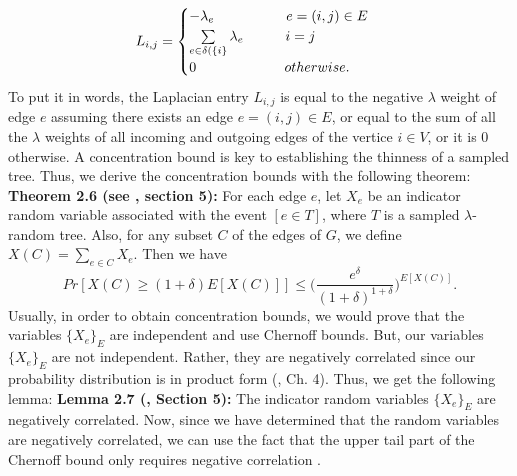 \documentclass[oneside]{projectpaper} %
\begin{document}
\begin{equation*}
L_{i,j} = 
  \begin{cases}
    -\lambda_e \indent \indent \indent \ \ e = (i,j) \in E \\
    \sum\limits_{e \in \delta(\{i\}}\lambda_e \indent \indent i = j \\
    0 \indent \indent \indent \indent \ otherwise.
  \end{cases}
\end{equation*}
To put it in words, the Laplacian entry $L_{i,j}$ is equal to the negative $\lambda$ weight of edge $e$ assuming there exists an edge $e = (i, j) \in E$, or equal to the sum of all the $\lambda$ weights of all incoming and outgoing edges of the vertice $i \in V$, or it is 0 otherwise. \newline
\indent A concentration bound is key to establishing the thinness of a sampled tree. Thus, we derive the concentration bounds with the following theorem:
\newline
\newline
\textbf{Theorem 2.6 (see \cite{AGM10}, section 5):} For each edge $e$, let $X_e$ be an indicator random variable associated with the event $[e \in T]$, where $T$ is a sampled $\lambda$-random tree. Also, for any subset $C$ of the edges of $G$, we define $X(C) = \sum\limits_{e \in C}X_e$. Then we have
\begin{equation*}
Pr[X(C) \geq (1 + \delta)E[X(C)]] \leq \bigg(\frac{e^{\delta}}{(1 + \delta)^{1 + \delta}}\bigg)^{E[X(C)]}.
\end{equation*}
Usually, in order to obtain concentration bounds, we would prove that the variables $\{X_e\}_E$ are independent and use Chernoff bounds. But, our variables $\{X_e\}_E$ are not independent. Rather, they are negatively correlated since our probability distribution is in product form (\cite{LP14}, Ch. 4). Thus, we get the following lemma:
\newline
\newline
\textbf{Lemma 2.7 (\cite{AGM10}, Section 5):} The indicator random variables $\{X_e\}_E$ are negatively correlated.
\newline
\newline
Now, since we have determined that the random variables are negatively correlated, we can use the fact that the upper tail part of the Chernoff bound only requires negative correlation \cite{PS97}.

\end{document}
